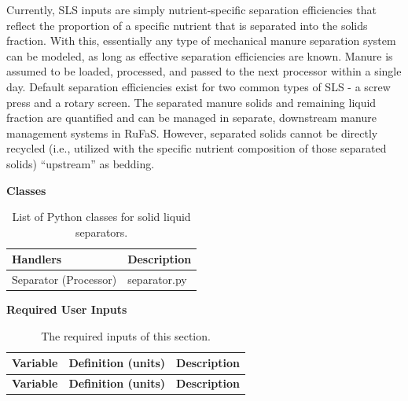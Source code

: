 \begin{refsection}
Currently, SLS inputs are simply nutrient-specific separation efficiencies that reflect the proportion of a specific nutrient that is separated into the solids fraction. With this, essentially any type of mechanical manure separation system can be modeled, as long as effective separation efficiencies are known. Manure is assumed to be loaded, processed, and passed to the next processor within a single day. Default separation efficiencies exist for two common types of SLS - a screw press and a rotary screen. The separated manure solids and remaining liquid fraction are quantified and can be managed in separate, downstream manure management systems in RuFaS. However, separated solids cannot be directly recycled (i.e., utilized with the specific nutrient composition of those separated solids) “upstream” as bedding.  
\vspace{0.5cm}

\textbf{Classes}
    \begin{table}[h!]
    \centering
    \renewcommand{\arraystretch}{1.3}

    \begin{center}
        \caption{List of Python classes for solid liquid separators.}
    \end{center}
    \vspace{0.2cm}
    
    \begin{tabular}{@{} C{3cm} C{4.5cm}  @{}}
    \toprule
    \textbf{Handlers} & \textbf{Description}   \\
    \midrule
    Separator (Processor)  & separator.py  \\

    \bottomrule
    \end{tabular}
    \end{table}

\textbf{Required User Inputs }
    \vspace{0.2cm}


\begin{longtable}{@{} L{4.5cm} L{2cm} L{8cm} @{}}
\caption{The required inputs of this section.} \\

\toprule
\textbf{Variable} & 
\textbf{Definition (units)} & 
\textbf{Description} \\
\midrule
\endfirsthead

\toprule
\textbf{Variable} & 
\textbf{Definition (units)} & 
\textbf{Description} \\
\midrule
\endhead


\end{longtable}
\end{refsection}
